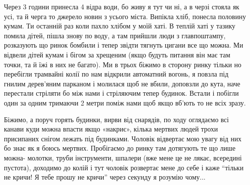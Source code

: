 
Через 3 години принесла 4 відра води, бо живу я тут чи ні, а в черзі стояла як
усі, та й черга то джерело новин з усього міста. Випікла хліб, понесла половину
кумам. Ти останній раз коли пахло хлібом у моїй хаті. В теплій хаті у тазику
помила дітей, пішла знову по воду, а там прийшли люди з главпоштампу,
розказують що ринок бомбили і тепер звідти тягнуть цигани все що можна. Ми
відвели дітей кумам і бігом за хрещеним (якщо будуть питання він має там точки,
та й їжі в них не багато). Ми в трьох біжимо в сторону ринку тільки но
перебігли трамвайні колії по нам відкрили автоматний вогонь, я повзла під
гнилим дерев'яним парканом і молилася щоб не вбили, доповзли до кута, наче
перестали стріляти бо між нами і стріляючим тепер будинок. Встали і побігли
один за одним тримаючи 2 метри поміж нами щоб якщо вб'ють то не всіх зразу.


Біжимо, а поруч горять будинки, вирви від снарядів, по ходу оглядаємо всі
канави куди можна впасти якщо «накриє», кілька мертвих людей трохи присипаних
снігом лежать під будинками. Чоловік відвертає мою увагу від них бо знає як я
боюсь мертвих. Пробігаємо до ринку там дотягують те що лише можна- молотки,
труби інструменти, шпалери (вже мене це не лякає, всередині пустота), доходимо
до колій і тут чоловік розвертає мене до себе і каже \enquote{тільки не кричи! Я тебе
прошу не кричи} через секунду я розумію чому...


